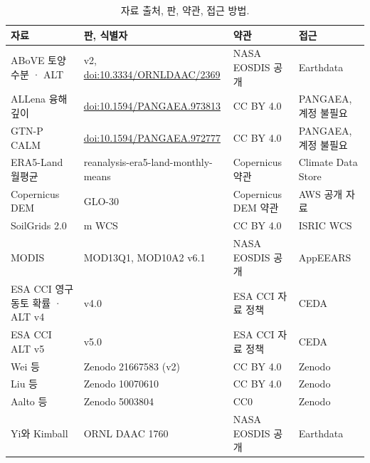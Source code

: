 \documentclass[pdflatex,sn-nature]{sn-jnl}
\begin{document}
\begin{table}[p]
\caption{자료 출처, 판, 약관, 접근 방법.}\label{tab:s1}
\scriptsize
\begin{tabular}{@{}>{\raggedright\arraybackslash}p{}>{\raggedright\arraybackslash}p{}>{\raggedright\arraybackslash}p{}>{\raggedright\arraybackslash}p{}@{}}
\toprule
자료 & 판, 식별자 & 약관 & 접근 \\
\midrule
ABoVE 토양 수분 · ALT\cite{Moore2025} & v2, \url{doi:10.3334/ORNLDAAC/2369} & NASA EOSDIS 공개 & Earthdata \\
ALLena 융해 깊이\cite{Veremeeva2025} & \url{doi:10.1594/PANGAEA.973813} & CC BY 4.0 & PANGAEA, 계정 불필요 \\
GTN-P CALM\cite{Streletskiy2025} & \url{doi:10.1594/PANGAEA.972777} & CC BY 4.0 & PANGAEA, 계정 불필요 \\
ERA5-Land 월평균\cite{munozsabater2021_era5_land} & reanalysis-era5-land-monthly-means & Copernicus 약관 & Climate Data Store \\
Copernicus DEM\cite{CopDEM2021} & GLO-30 & Copernicus DEM 약관 & AWS 공개 자료 \\
SoilGrids 2.0\cite{Poggio2021} & 250 m WCS & CC BY 4.0 & ISRIC WCS \\
MODIS\cite{Didan2021,HallRiggs2021} & MOD13Q1, MOD10A2 v6.1 & NASA EOSDIS 공개 & AppEEARS \\
ESA CCI 영구동토 확률 · ALT v4\cite{Westermann2024} & v4.0 & ESA CCI 자료 정책 & CEDA \\
ESA CCI ALT v5\cite{Westermann2025} & v5.0 & ESA CCI 자료 정책 & CEDA \\
Wei 등\cite{Wei2026} & Zenodo 21667583 (v2) & CC BY 4.0 & Zenodo \\
Liu 등\cite{Liu2024} & Zenodo 10070610 & CC BY 4.0 & Zenodo \\
Aalto 등\cite{Aalto2018} & Zenodo 5003804 & CC0 & Zenodo \\
Yi와 Kimball\cite{YiKimball2019} & ORNL DAAC 1760 & NASA EOSDIS 공개 & Earthdata \\
\bottomrule
\end{tabular}
\end{table}
\end{document}
